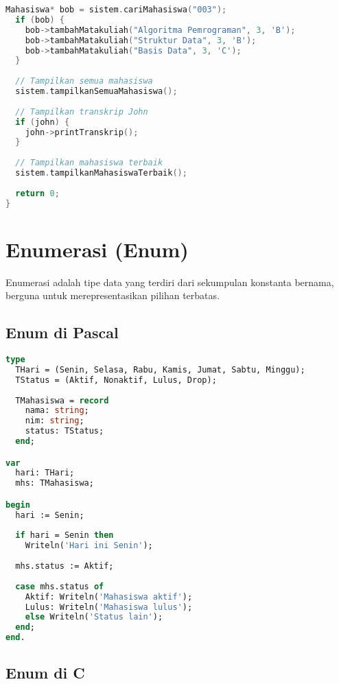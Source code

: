 \documentclass[../main.tex]{subfiles}
\begin{document}
\begin{lstlisting}[language=C++, caption={Sistem manajemen mahasiswa di C++}]
  Mahasiswa* bob = sistem.cariMahasiswa("003");
  if (bob) {
    bob->tambahMatakuliah("Algoritma Pemrograman", 3, 'B');
    bob->tambahMatakuliah("Struktur Data", 3, 'B');
    bob->tambahMatakuliah("Basis Data", 3, 'C');
  }
  
  // Tampilkan semua mahasiswa
  sistem.tampilkanSemuaMahasiswa();
  
  // Tampilkan transkrip John
  if (john) {
    john->printTranskrip();
  }
  
  // Tampilkan mahasiswa terbaik
  sistem.tampilkanMahasiswaTerbaik();
  
  return 0;
}
\end{lstlisting}

\section{Enumerasi (Enum)}

Enumerasi adalah tipe data yang terdiri dari sekumpulan konstanta bernama, berguna untuk merepresentasikan pilihan terbatas.

\subsection{Enum di Pascal}

\begin{lstlisting}[language=Pascal, caption={Enum di Pascal}]
type
  THari = (Senin, Selasa, Rabu, Kamis, Jumat, Sabtu, Minggu);
  TStatus = (Aktif, Nonaktif, Lulus, Drop);
  
  TMahasiswa = record
    nama: string;
    nim: string;
    status: TStatus;
  end;

var
  hari: THari;
  mhs: TMahasiswa;

begin
  hari := Senin;
  
  if hari = Senin then
    Writeln('Hari ini Senin');
  
  mhs.status := Aktif;
  
  case mhs.status of
    Aktif: Writeln('Mahasiswa aktif');
    Lulus: Writeln('Mahasiswa lulus');
    else Writeln('Status lain');
  end;
end.
\end{lstlisting}

\subsection{Enum di C}
\end{document}
